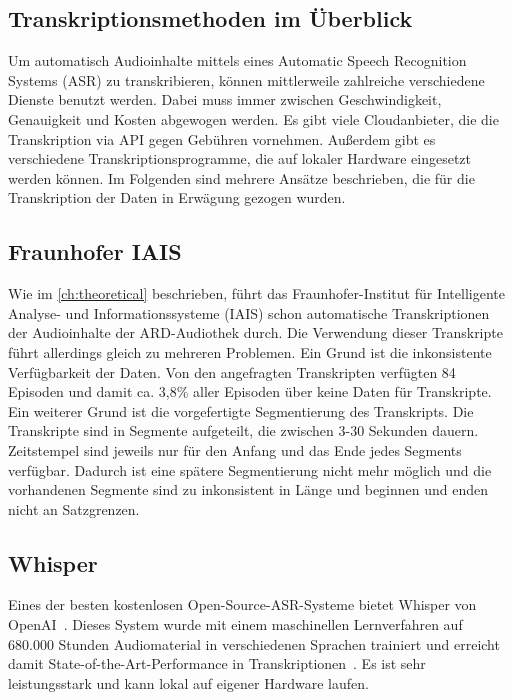 \subsection{Transkriptionsmethoden im Überblick}

Um automatisch Audioinhalte mittels eines Automatic Speech Recognition Systems (ASR) zu transkribieren, können mittlerweile zahlreiche verschiedene Dienste benutzt werden.
Dabei muss immer zwischen Geschwindigkeit, Genauigkeit und Kosten abgewogen werden.
Es gibt viele Cloudanbieter, die die Transkription via API gegen Gebühren vornehmen.
Außerdem gibt es verschiedene Transkriptionsprogramme, die auf lokaler Hardware eingesetzt werden können.
Im Folgenden sind mehrere Ansätze beschrieben, die für die Transkription der Daten in Erwägung gezogen wurden.

\subsection{Fraunhofer IAIS}

Wie im \autoref{ch:theoretical} beschrieben, führt das Fraunhofer-Institut für Intelligente Analyse- und Informationssysteme (IAIS) schon automatische Transkriptionen der Audioinhalte der ARD-Audiothek durch.
Die Verwendung dieser Transkripte führt allerdings gleich zu mehreren Problemen.
Ein Grund ist die inkonsistente Verfügbarkeit der Daten.
Von den angefragten Transkripten verfügten 84 Episoden und damit ca. 3,8\% aller Episoden über keine Daten für Transkripte.
Ein weiterer Grund ist die vorgefertigte Segmentierung des Transkripts.
Die Transkripte sind in Segmente aufgeteilt, die zwischen 3-30 Sekunden dauern.
Zeitstempel sind jeweils nur für den Anfang und das Ende jedes Segments verfügbar.
Dadurch ist eine spätere Segmentierung nicht mehr möglich und die vorhandenen Segmente sind zu inkonsistent in Länge und beginnen und enden nicht an Satzgrenzen.

\subsection{Whisper}

Eines der besten kostenlosen Open-Source-ASR-Systeme bietet Whisper von OpenAI~\cite{radford}.
Dieses System wurde mit einem maschinellen Lernverfahren auf 680.000 Stunden Audiomaterial in verschiedenen Sprachen trainiert und erreicht damit State-of-the-Art-Performance in Transkriptionen~\cite{radford}.
Es ist sehr leistungsstark und kann lokal auf eigener Hardware laufen.

